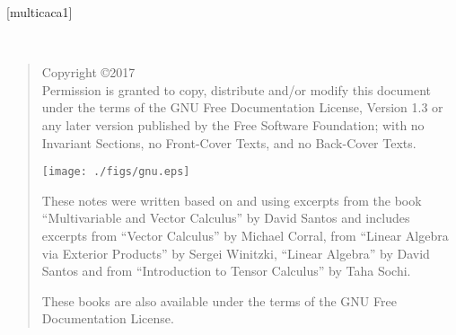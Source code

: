 \documentclass[11pt,oneside]{book} %
\begin{document}
[multicaca1]


\makeatletter
{}


\newpage
~\vfill
\thispagestyle{empty}


\noindent
\begin{quote}
    Copyright \copyright{}2017\\
    Permission is granted to copy, distribute and/or modify this document
    under the terms of the GNU Free Documentation License, Version 1.3
    or any later version published by the Free Software Foundation;
    with no Invariant Sections, no Front-Cover Texts, and no Back-Cover Texts.
\begin{center}
 \texttt{[image: ./figs/gnu.eps]}
\end{center}


    \vspace{0.5cm}

These notes were written  based on and using excerpts from the book
``Multivariable and Vector Calculus'' by David Santos and  includes  excerpts
from
``Vector Calculus'' by Michael Corral, from ``Linear Algebra via Exterior
Products'' by Sergei Winitzki, ``Linear Algebra'' by David Santos and from ``Introduction to Tensor Calculus'' by Taha Sochi.

    These books are also available  under the terms of the GNU Free Documentation License.
\end{quote}



 
\cleardoublepage
\pagestyle{empty} %
\end{document}
